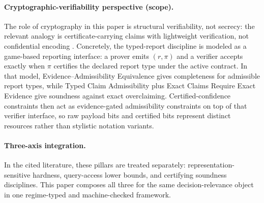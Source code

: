 \paragraph{Cryptographic-verifiability perspective (scope).}
The role of cryptography in this paper is structural verifiability, not secrecy: the relevant analogy is certificate-carrying claims with lightweight verification, not confidential encoding \cite{goldwasser1989knowledge,necula1997proof}. Concretely, the typed-report discipline is modeled as a game-based reporting interface: a prover emits $(r,\pi)$ and a verifier accepts exactly when $\pi$ certifies the declared report type under the active contract. In that model, Evidence--Admissibility Equivalence gives completeness for admissible report types, while Typed Claim Admissibility plus Exact Claims Require Exact Evidence give soundness against exact overclaiming. Certified-confidence constraints then act as evidence-gated admissibility constraints on top of that verifier interface, so raw payload bits and certified bits represent distinct resources rather than stylistic notation variants.

\paragraph{Three-axis integration.}
In the cited literature, these pillars are treated separately: representation-sensitive hardness, query-access lower bounds, and certifying soundness disciplines. This paper composes all three for the same decision-relevance object in one regime-typed and machine-checked framework.
